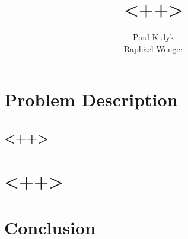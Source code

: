\documentclass{article}
\title{<++>}
\author{Paul Kulyk \\
Raphäel Wenger}
\begin{document}
\maketitle
\tableofcontents

\newpage

\section{Problem Description}
\subsection{<++>}

\newpage
\section{<++>}

\newpage
\section{Conclusion}
\end{document}
